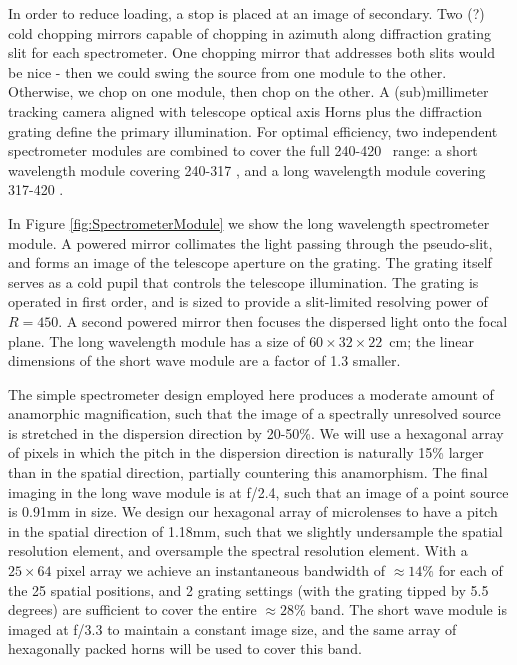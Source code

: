 In order to reduce loading, a stop is placed at an image of secondary.  %
Two (?) cold chopping mirrors capable of chopping in azimuth along diffraction grating slit for each spectrometer.  One chopping mirror that addresses both slits would be nice - then we could swing the source from one module to the other.  Otherwise, we chop on one module, then chop on the other.
A (sub)millimeter tracking camera aligned with telescope optical axis
Horns plus the diffraction grating define the primary illumination.
For optimal efficiency, two independent spectrometer modules 
are combined to cover the full 240-420 \mum\ range: a short wavelength module covering 240-317 \mum, and a long wavelength module covering 317-420 \mum. 

In Figure \ref{fig:SpectrometerModule} we show the long wavelength spectrometer module. A powered mirror collimates the light passing through the pseudo-slit, and forms an image of the telescope aperture on the grating. The grating itself serves as a cold pupil that controls the telescope illumination. The grating is
operated in first order, and is sized to provide a slit-limited resolving power of $R=450$. A second powered mirror then focuses the dispersed light onto the focal plane. The long wavelength module has a size of $60 \times 32 \times 22$~cm; the linear dimensions of the short wave module are a factor of 1.3 smaller.

The simple spectrometer design employed here produces a moderate amount of
anamorphic magnification, such that the image of a spectrally unresolved
source is stretched in the dispersion direction by 20-50\%. We will use a
hexagonal array of pixels in which the pitch in the dispersion direction
is naturally 15\% larger than in the spatial direction, partially
countering this anamorphism. The final imaging in the long wave module is
at f/2.4, such that an image of a point source is 0.91mm in size. We
design our hexagonal array of microlenses to have a pitch in the spatial
direction of 1.18mm, such that we slightly undersample the spatial
resolution element, and oversample the spectral resolution element. With a
$25\times64$ pixel array we achieve an instantaneous bandwidth of $\approx$$14\%$
for each of the 25 spatial positions, and 2 grating settings (with the
grating tipped by 5.5 degrees) are sufficient to cover the entire
$\approx$$28\%$ band. The short wave module is imaged at f/3.3 to maintain
a constant image size, and the same array of hexagonally packed horns
will be used to cover this band.
 
